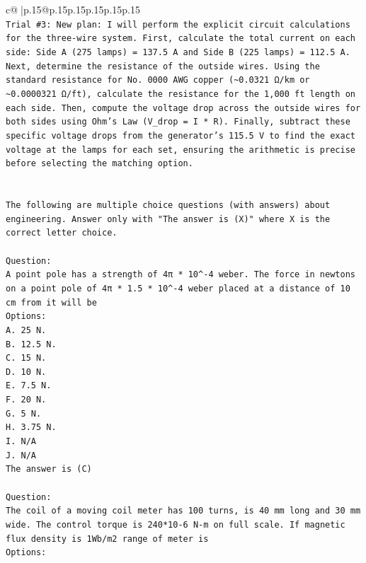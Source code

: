 \documentclass{article}
\begin{document}
{\begin{supertabular}{c@{$\;$}|p{.15\linewidth}@{}p{.15\linewidth}p{.15\linewidth}p{.15\linewidth}p{.15\linewidth}p{.15\linewidth}}
{{{\\ 
\texttt{Trial \#3: New plan: I will perform the explicit circuit calculations for the three{-}wire system. First, calculate the total current on each side: Side A (275 lamps) = 137.5 A and Side B (225 lamps) = 112.5 A. Next, determine the resistance of the outside wires. Using the standard resistance for No. 0000 AWG copper (\textasciitilde{}0.0321 Ω/km or \textasciitilde{}0.0000321 Ω/ft), calculate the resistance for the 1,000 ft length on each side. Then, compute the voltage drop across the outside wires for both sides using Ohm's Law (V\_drop = I * R). Finally, subtract these specific voltage drops from the generator's 115.5 V to find the exact voltage at the lamps for each set, ensuring the arithmetic is precise before selecting the matching option.} \\
\\ 
\\ 
\texttt{The following are multiple choice questions (with answers) about engineering. Answer only with "The answer is (X)" where X is the correct letter choice.} \\
\\ 
\texttt{Question:} \\
\texttt{A point pole has a strength of 4π * 10\^{}{-}4 weber. The force in newtons on a point pole of 4π * 1.5 * 10\^{}{-}4 weber placed at a distance of 10 cm from it will be} \\
\texttt{Options:} \\
\texttt{A. 25 N.} \\
\texttt{B. 12.5 N.} \\
\texttt{C. 15 N.} \\
\texttt{D. 10 N.} \\
\texttt{E. 7.5 N.} \\
\texttt{F. 20 N.} \\
\texttt{G. 5 N.} \\
\texttt{H. 3.75 N.} \\
\texttt{I. N/A} \\
\texttt{J. N/A} \\
\texttt{The answer is (C)} \\
\\ 
\texttt{Question:} \\
\texttt{The coil of a moving coil meter has 100 turns, is 40 mm long and 30 mm wide. The control torque is 240*10{-}6 N{-}m on full scale. If magnetic flux density is 1Wb/m2 range of meter is} \\
\texttt{Options:} \\
}}}
\end{supertabular}}
\end{document}
